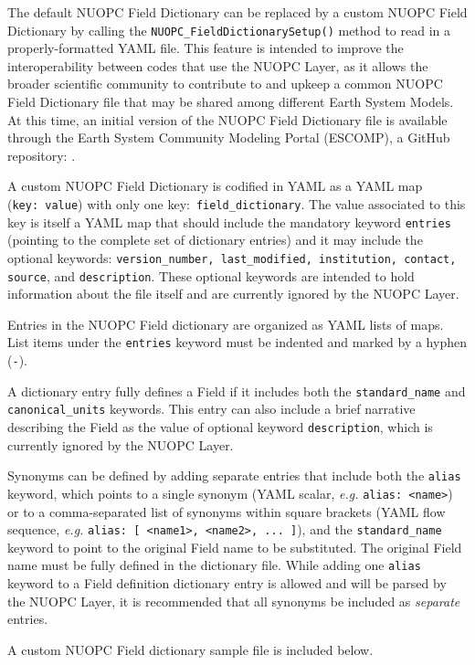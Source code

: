 The default NUOPC Field Dictionary can be replaced by a custom NUOPC Field Dictionary by calling the {\tt NUOPC\_FieldDictionarySetup()} method to read in a properly-formatted YAML file. This feature is intended to improve the interoperability between codes that use the NUOPC Layer, as it allows the broader scientific community to contribute to and upkeep a common NUOPC Field Dictionary file that may be shared among different Earth System Models. At this time, an initial version of the NUOPC Field Dictionary file is available through the Earth System Community Modeling Portal (ESCOMP), a GitHub repository: .

A custom NUOPC Field Dictionary is codified in YAML as a YAML map ({\tt key:\ value}) with only one key:~{\tt field\_dictionary}. The value associated to this key is itself a YAML map that should include the mandatory keyword {\tt entries} (pointing to the complete set of dictionary entries) and it may include the optional keywords: {\tt version\_number, last\_modified, institution, contact, source}, and {\tt description}. These optional keywords are intended to hold information about the file itself and are currently ignored by the NUOPC Layer.

Entries in the NUOPC Field dictionary are organized as YAML lists of maps. List items under the {\tt entries} keyword must be indented and marked by a hyphen ({\tt -}).

A dictionary entry fully defines a Field if it includes both the {\tt standard\_name} and {\tt canonical\_units} keywords. This entry can also include a brief narrative describing the Field as the value of optional keyword {\tt description}, which is currently ignored by the NUOPC Layer.

Synonyms can be defined by adding separate entries that include both the {\tt alias} keyword, which points to a single synonym (YAML scalar, {\it e.g.\/} {\tt alias:~<name>}) or to a comma-separated list of synonyms within square brackets (YAML flow sequence, {\it e.g.\/} {\tt alias:~[ <name1>, <name2>, ... ]}), and the {\tt standard\_name} keyword to point to the original Field name to be substituted. The original Field name must be fully defined in the dictionary file. While adding one {\tt alias} keyword to a Field definition dictionary entry is allowed and will be parsed by the NUOPC Layer, it is recommended that all synonyms be included as {\it separate} entries.

A custom NUOPC Field dictionary sample file is included below.

